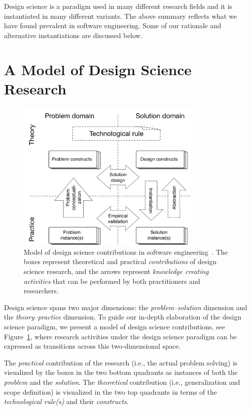 \documentclass[graybox]{svmult}
\begin{document}
Design science is a paradigm used in many different research fields and it is instantiated in many different variants. The above summary reflects what we have found prevalent in software engineering. Some of our rationale and alternative instantiations are discussed below.



\section{A Model of Design Science Research}
\label{sec:DesignScienceResearch}


\begin{figure}[t]
\centering
 \includegraphics[width=0.8\textwidth]{Figures/DS_model.pdf}
\caption{Model of design science contributions in software engineering~\cite{Engstrom19arxiv}. The boxes represent theoretical and practical \emph{contributions} of design science research, and the arrows represent \emph{knowledge creating activities} that can be performed by both practitioners and researchers.}
\label{fig:DS_model}       %
\end{figure}

Design science spans two major dimensions: the \emph{problem--solution} dimension and the \emph{theory--practice} dimension. To guide our in-depth elaboration of the design science paradigm, we present a model of design science contributions, see Figure~\ref{fig:DS_model}, where research activities under the design science paradigm can be expressed as transitions across this two-dimensional space.

The \emph{practical} contribution of the research (i.e., the actual problem solving) is visualized by the boxes in the two bottom quadrants as instances of both the \emph{problem} and the \emph{solution}. The \emph{theoretical} contribution (i.e., generalization and scope definition) is visualized in the two top quadrants in terms of the \emph{technological rule(s)} and their \emph{constructs}. 
\end{document}
